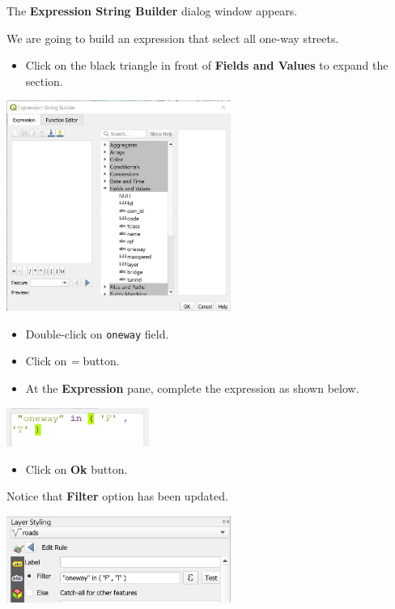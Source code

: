 \documentclass[
  letterpaper,
  DIV=11,
  numbers=noendperiod]{scrreprt}
\providecommand{\tightlist}{%
  \setlength{\itemsep}{0pt}\setlength{\parskip}{0pt}}\usepackage{longtable,booktabs,array}
\begin{document}
The \textbf{Expression String Builder} dialog window appears.

We are going to build an expression that select all one-way streets.

\begin{itemize}
\tightlist
\item
  Click on the black triangle in front of \textbf{Fields and Values} to
  expand the section.
\end{itemize}

\includegraphics[width=0.55\textwidth,height=\textheight]{./img09/image12.jpg}

\begin{itemize}
\item
  Double-click on \texttt{oneway} field.
\item
  Click on \emph{=} button.
\item
  At the \textbf{Expression} pane, complete the expression as shown
  below.
\end{itemize}

\includegraphics[width=0.35\textwidth,height=\textheight]{./img09/image13.jpg}

\begin{itemize}
\tightlist
\item
  Click on \textbf{Ok} button.
\end{itemize}

Notice that \textbf{Filter} option has been updated.

\includegraphics[width=0.55\textwidth,height=\textheight]{./img09/image14.jpg}
\end{document}
